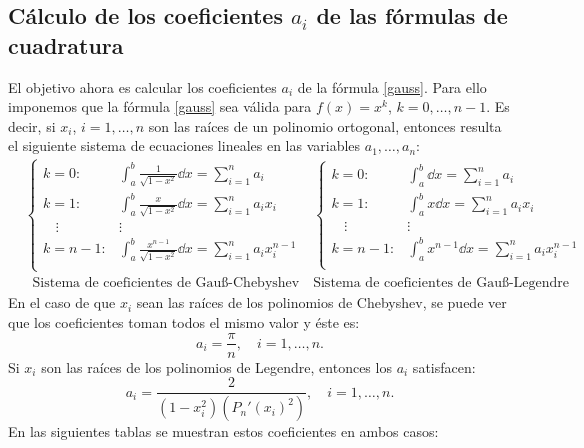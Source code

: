 \documentclass[a4paper]{article}
\begin{document}
\subsection*{Cálculo de los coeficientes $a_i$ de las fórmulas de cuadratura}
El objetivo ahora es calcular los coeficientes $a_i$ de la fórmula \eqref{gauss}. Para ello imponemos que la fórmula \eqref{gauss} sea válida para $f(x)=x^k$, $k=0,\ldots,n-1$. Es decir, si $x_i$, $i=1,\ldots,n$ son las raíces de un polinomio ortogonal, entonces resulta el siguiente sistema de ecuaciones lineales en las variables $a_1,\ldots,a_n$:
\begin{align*}
    &\left\{
    \begin{array}{lc}
        k=0: & \displaystyle\int_a^b\frac{1}{\sqrt{1-x^2}}\dd x=\sum_{i=1}^na_i\\
        k=1: & \displaystyle\int_a^b\frac{x}{\sqrt{1-x^2}}\dd x=\sum_{i=1}^na_ix_i\\
        \hspace{11pt}\vdots & \vdots \\
        k=n-1: & \displaystyle\int_a^b\frac{x^{n-1}}{\sqrt{1-x^2}}\dd x=\sum_{i=1}^na_ix_i^{n-1}\\
    \end{array}\right.
     &
    \left\{
    \begin{array}{lc}
        k=0: & \displaystyle\int_a^b\dd x=\sum_{i=1}^na_i\\
        k=1: & \displaystyle\int_a^bx\dd x=\sum_{i=1}^na_ix_i\\
        \hspace{11pt}\vdots & \vdots \\
        k=n-1: & \displaystyle\int_a^bx^{n-1}\dd x=\sum_{i=1}^na_ix_i^{n-1}\\
    \end{array}\right.
    \\
    &\;\;\text{Sistema de coeficientes de Gau\ss-Chebyshev} & \text{Sistema de coeficientes de Gau\ss-Legendre}
\end{align*}
En el caso de que $x_i$ sean las raíces de los polinomios de Chebyshev, se puede ver que los coeficientes toman todos el mismo valor y éste es: $$a_i=\frac{\pi}{n},\quad i=1,\ldots,n.$$ Si $x_i$ son las raíces de los polinomios de Legendre, entonces los $a_i$ satisfacen: $$a_i=\frac{2}{(1-x_i^2)(P_n'(x_i)^2)},\quad i=1,\ldots,n.$$ En las siguientes tablas se muestran estos coeficientes en ambos casos:
\end{document}

